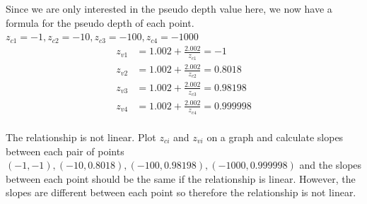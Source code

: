 \documentclass{article} %
\begin{document}
Since we are only interested in the pseudo depth value here, we now have a formula for the pseudo depth of each point.
$z_{c1}=-1, z_{c2}=-10, z_{c3} = -100, z_{c4} = -1000$
\begin{align*}
z_{v1} &= 1.002 + \frac{2.002}{z_{c1}} = -1\\
z_{v2} &= 1.002 + \frac{2.002}{z_{c2}} = 0.8018\\
z_{v3} &= 1.002 + \frac{2.002}{z_{c3}} = 0.98198\\
z_{v4} &= 1.002 + \frac{2.002}{z_{c4}} = 0.999998\\
\end{align*}

The relationship is not linear. Plot $z_{ci}$ and $z_{vi}$ on a graph and calculate slopes between each pair of points $(-1, -1), (-10, 0.8018), (-100, 0.98198), (-1000, 0.999998)$ and the slopes between each point should be the same if the relationship is linear. However, the slopes are different between each point so therefore the relationship is not linear.

\end{document}

